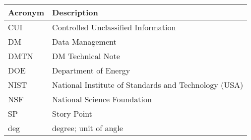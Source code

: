 \addtocounter{table}{-1}
\begin{longtable}{p{}p{}}\hline
\textbf{Acronym} & \textbf{Description}  \\\hline

CUI & Controlled Unclassified Information \\\hline
DM & Data Management \\\hline
DMTN & DM Technical Note \\\hline
DOE & Department of Energy \\\hline
NIST & National Institute of Standards and Technology (USA) \\\hline
NSF & National Science Foundation \\\hline
SP & Story Point \\\hline
deg & degree; unit of angle \\\hline
\end{longtable}

